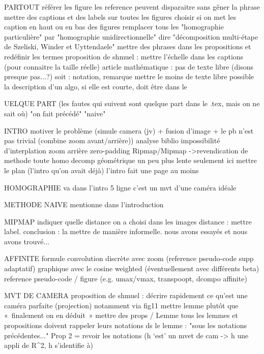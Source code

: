 PARTOUT
	référer les figure
	les reference peuvent disparaitre sans gêner la phrase
	mettre des captions et des labels sur toutes les figures
	choisir si on met les caption en haut ou en bas des figures
	remplacer tous les "homographie particulière" par "homographie unidirectionnelle"
	dire "décomposition multi-étape de Szeliski, Winder et Uyttendaele"
	mettre des phrases dans les propositions et redéfinir les termes
	proposition de shmuel : mettre l'échelle dans les captions (pour connaitre la taille réelle)
	article mathématique : pas de texte libre (disons presque pas...?)
		soit : notation, remarque
	mettre le moins de texte libre possible
	la description d'un algo, si elle est courte, doit être dans le \caption

QUELQUE PART
(les fautes qui suivent sont quelque part dans le .tex, mais on ne sait où)
	"on fait précédé"
	"naive"




INTRO
motiver le problème (simule camera (jv) + fusion d’image + le pb n’est pas trivial (combine zoom avant/arrière))
analyse biblio
	impossibilité d’interplation 
	zoom arrière zero-padding
	Ripmap/Mipmap
->revendication de methode
	toute homo
	decomp géométrique
	un peu plus lente
seulement ici mettre le plan (l'intro qu'on avait déjà)
l'intro fait une page au moins





HOMOGRAPHIE
	va dans l’intro 5 ligne
	c’est un mvt d’une caméra idéale

METHODE NAIVE
	mentionne dans l’introduction 

MIPMAP
	indiquer quelle distance on a choisi
	dans les images distance : mettre label.
	conclusion : la mettre de manière informelle.
	nous avons essayés et nous avons trouvé...

AFFINITE
	formule convolution discrète avec zoom (reference pseudo-code supp adaptatif)
	graphique avec le cosine weighted (éventuellement avec différents beta)
	reference pseudo-code / figure (e.g. umax/vmax, transpoopt, dcompo affinite)




MVT DE CAMERA
	proposition de shmuel : décrire rapidement ce qu'est une caméra parfaite (projection) notamment via fig11
	mettre lemme plutôt que « finalement on en déduit »
	mettre des props / Lemme
		tous les lemmes et propositions doivent rappeler leurs notations
		ds le lemme : "sous les notations précédentes..."
	Prop 2 = revoir les notations (h ‘est’ un mvet de cam -> h une appli de R^2, h s'identifie à)

